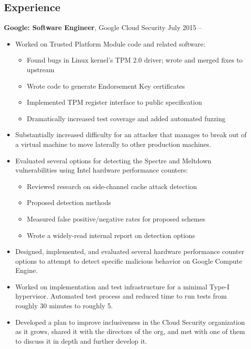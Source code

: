 \documentclass[margin]{res}
\begin{document}
\begin{resume}
\section{Experience}
  \textbf{Google: Software Engineer}, Google Cloud Security \hfill July 2015 --
  \begin{minipage}{0.84\textwidth}
    \vspace{0.2em}
    \begin{itemize}
        \item Worked on Trusted Platform Module code and related software:
          \vspace{-0.5em}
          \begin{itemize}
            \item Found bugs in Linux kernel's TPM 2.0 driver; wrote and
              merged fixes to upstream
            \item Wrote code to generate Endorsement Key certificates
            \item Implemented TPM register interface to public specification
            \item Dramatically increased test coverage and added automated fuzzing
          \end{itemize}
        \item Substantially increased difficulty for an attacker that manages
          to break out of a virtual machine to move laterally to other
          production machines.
        \item Evaluated several options for detecting the Spectre and Meltdown
          vulnerabilities using Intel hardware performance counters:
          \vspace{-0.5em}
          \begin{itemize}
            \item Reviewed research on side-channel cache attack detection
            \item Proposed detection methods
            \item Measured false positive/negative rates for proposed schemes
            \item Wrote a widely-read internal report on detection options
          \end{itemize}
        \item Designed, implemented, and evaluated several hardware
          performance counter options to attempt to detect specific
          malicious behavior on Google Compute Engine.
        \item Worked on implementation and test infrastructure for a
          minimal Type-I hypervisor. Automated test process and reduced time
          to run tests from roughly 30 minutes to roughly 5.
        \item Developed a plan to improve inclusiveness in the Cloud Security
          organization as it grows, shared it with the directors of the org,
          and met with one of them to discuss it in depth and further develop
          it.
    \end{itemize}
  \end{minipage}


\end{resume}
\end{document}
